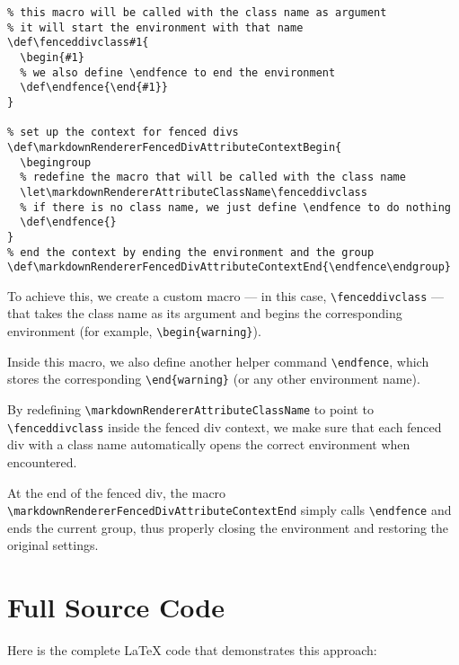 \documentclass[]{article}
\def\fenceddivclass#1{
  \begin{#1}
  \def\endfence{\end{#1}}
}
\def\markdownRendererFencedDivAttributeContextBegin{
  \begingroup
  \let\markdownRendererAttributeClassName\fenceddivclass
  \def\endfence{}
}
\def\markdownRendererFencedDivAttributeContextEnd{\endfence\endgroup}
\begin{document}
\begin{verbatim}
% this macro will be called with the class name as argument 
% it will start the environment with that name
\def\fenceddivclass#1{
  \begin{#1}
  % we also define \endfence to end the environment
  \def\endfence{\end{#1}}
}

% set up the context for fenced divs
\def\markdownRendererFencedDivAttributeContextBegin{
  \begingroup
  % redefine the macro that will be called with the class name 
  \let\markdownRendererAttributeClassName\fenceddivclass
  % if there is no class name, we just define \endfence to do nothing
  \def\endfence{}
}
% end the context by ending the environment and the group
\def\markdownRendererFencedDivAttributeContextEnd{\endfence\endgroup}
\end{verbatim}


To achieve this, we create a custom macro --- in this case,
\Verb|\fenceddivclass| --- that takes the class name as its argument and begins
the corresponding environment (for example, \Verb|\begin{warning}|).  

Inside this macro, we also define another helper command \Verb|\endfence|,
which stores the corresponding \Verb|\end{warning}| (or any other environment
name).  

By redefining \Verb|\markdownRendererAttributeClassName| to point to
\Verb|\fenceddivclass| inside the fenced div context, we make sure that each
fenced div with a class name automatically opens the correct environment when
encountered.  

At the end of the fenced div, the macro
\Verb|\markdownRendererFencedDivAttributeContextEnd| simply calls
\Verb|\endfence| and ends the current group, thus properly closing the
environment and restoring the original settings.


\section{Full Source Code}

Here is the complete \LaTeX{} code that demonstrates this approach:
\end{document}
